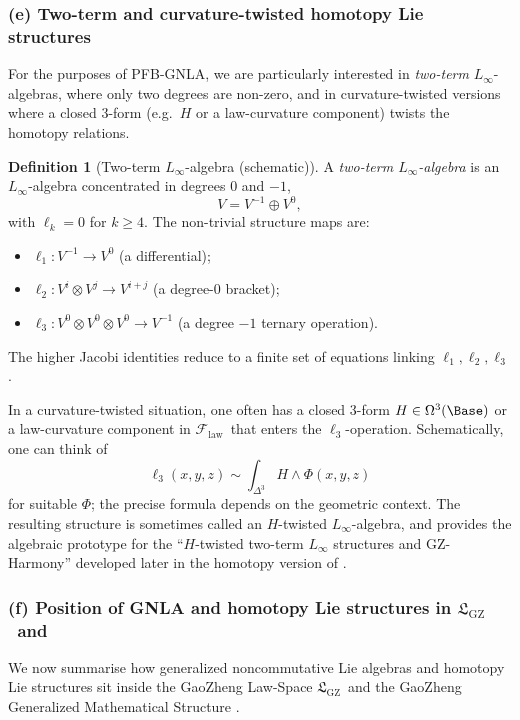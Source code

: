 \documentclass[11pt]{book}
\theoremstyle{plain}
\theoremstyle{definition}
\newtheorem{definition}[theorem]{Definition} \theoremstyle{remark}
\newcommand{\GZLS}{\ensuremath{\mathfrak{L}_{\mathrm{GZ}}}}       \newcommand{\GZLT}{\ensuremath{M_{!w}}}                           \newcommand{\GZLOC}{\ensuremath{A_M}}                             \newcommand{\GZLCurv}{\ensuremath{\mathcal{F}_{\mathrm{law}}}}
\begin{document}
\subsubsection*{(e) Two-term and curvature-twisted homotopy Lie structures}

For the purposes of PFB-GNLA, we are particularly interested in
\emph{two-term} $L_\infty$-algebras, where only two degrees are
non-zero, and in curvature-twisted versions where a closed 3-form
(e.g.\ $H$ or a law-curvature component) twists the homotopy relations.



\begin{definition}[Two-term $L_\infty$-algebra (schematic)]
A \emph{two-term $L_\infty$-algebra} is an $L_\infty$-algebra
  concentrated in degrees $0$ and $-1$,
  \[
     V = V^{-1}\oplus V^0,
  \]
  with $\ell_k=0$ for $k\ge4$. The non-trivial structure maps are:
  \begin{itemize}
    \item $\ell_1:V^{-1}\to V^0$ (a differential);
    \item $\ell_2:V^i\otimes V^j\to V^{i+j}$ (a degree-$0$ bracket);
    \item $\ell_3:V^0\otimes V^0\otimes V^0\to V^{-1}$ (a degree $-1$
          ternary operation).
  \end{itemize}
  The higher Jacobi identities reduce to a finite set of equations
  linking $\ell_1,\ell_2,\ell_3$.
\end{definition}

In a curvature-twisted situation, one often has a closed 3-form
$H\in\Omega^3(\Base)$ or a law-curvature component in \GZLCurv\ that
enters the $\ell_3$-operation. Schematically, one can think of
\[
   \ell_3(x,y,z)
   \sim
   \int_{\Delta^3} H\wedge \Phi(x,y,z)
\]
for suitable $\Phi$; the precise formula depends on the geometric
context. The resulting structure is sometimes called an $H$-twisted
$L_\infty$-algebra, and provides the algebraic prototype for the
“$H$-twisted two-term $L_\infty$ structures and GZ-Harmony” developed
later in the homotopy version of \GAlgebra.



\subsubsection*{(f) Position of GNLA and homotopy Lie structures in \GZLS\ and \GZGMS}

We now summarise how generalized noncommutative Lie algebras and
homotopy Lie structures sit inside the GaoZheng Law-Space \GZLS\ and
the GaoZheng Generalized Mathematical Structure \GZGMS.
\end{document}
